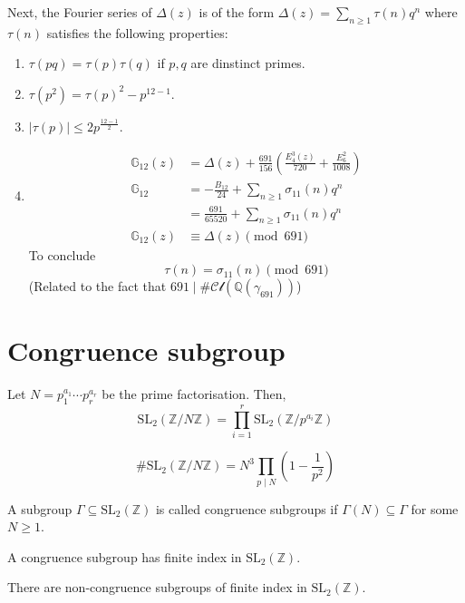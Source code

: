 \documentclass[oneside, 12pt, ]{scrbook}
\newcommand{\QQ}{\mathbb Q}
\newcommand{\ZZ}{\mathbb Z}
\theoremstyle{theorem}
\begin{document}
Next, the Fourier series of $\Delta(z)$ is of the form $\Delta(z) = \sum_{n \geq 1} \tau(n)q^n$ where $\tau(n)$ satisfies the following properties: 
\begin{enumerate}
\item $\tau(pq) =\tau(p)\tau(q)$ if $p,q$ are dinstinct primes. 
\item $\tau(p^2) = \tau(p)^2 - p^{12-1}$.
\item $|\tau(p)| \le 2 p^{\frac{12-1}{2}}$.
\item 
\begin{align*}
\mathbb{G}_{12}(z) &= \Delta(z) + \frac{691}{156} \left( \frac{E_{4}^3(z)}{720} + \frac{E_{6}^2}{1008} \right) \\
\mathbb{G}_{12} &= -\frac{B_{12}}{24} + \sum_{n \geq 1} \sigma_{11}(n) q^n \\
&= \frac{691}{65520} + \sum_{n \geq 1} \sigma_{11}(n) q^n \\ 
\mathbb{G}_{12}(z) &\equiv \Delta(z) \pmod{691}
\end{align*}
To conclude $$\tau(n) = \sigma_{11}(n) \pmod{691}$$
(Related to the fact that $691 \mid \# \mathcal{Cl}(\QQ(\gamma_{691}))$)
\end{enumerate}

\section{Congruence subgroup}

\begin{proposition}
Let $N=p_{1}^{a_{1}}\cdots p_{r}^{a_{r}}$ be the prime factorisation. Then, $$\mathrm{SL}_{2} (\ZZ / N \ZZ) = \prod_{i=1}^{r} \mathrm{SL}_{2}(\ZZ / p^{a_{i}} \ZZ) $$ 
\end{proposition}

\begin{lemma}
$$\# \mathrm{SL}_{2}(\ZZ / N \ZZ) = N^3 \prod_{p \mid N} \left( 1 - \frac{1}{p^2} \right)$$
\end{lemma}

\begin{definition}
A subgroup $\Gamma \subseteq \mathrm{SL}_{2}(\ZZ)$ is called congruence subgroups if $\Gamma(N) \subseteq \Gamma$ for some $N \geq 1$.
\end{definition}

\begin{lemma}
A congruence subgroup has finite index in $\mathrm{SL}_{2}(\ZZ)$.
\end{lemma}

\begin{remark}
There are non-congruence subgroups of finite index in $\mathrm{SL}_{2}(\ZZ)$.
\end{remark}
\end{document}

